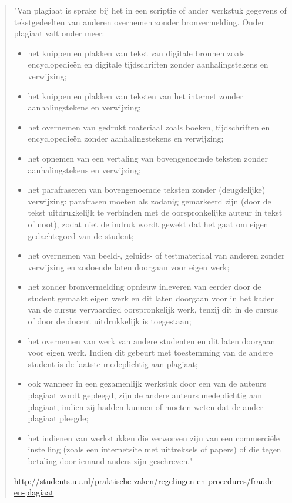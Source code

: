 \documentclass[
]{book}
\begin{document}
\begin{quote}
"Van plagiaat is sprake bij het in een scriptie of ander werkstuk
gegevens of tekstgedeelten van anderen overnemen zonder
bronvermelding. Onder plagiaat valt onder meer:

\begin{itemize}
\item
  het knippen en plakken van tekst van digitale bronnen zoals
  encyclopedieën en digitale tijdschriften zonder aanhalingstekens
  en verwijzing;
\item
  het knippen en plakken van teksten van het internet zonder
  aanhalingstekens en verwijzing;
\item
  het overnemen van gedrukt materiaal zoals boeken, tijdschriften en
  encyclopedieën zonder aanhalingstekens en verwijzing;
\item
  het opnemen van een vertaling van bovengenoemde teksten zonder
  aanhalingstekens en verwijzing;
\item
  het parafraseren van bovengenoemde teksten zonder (deugdelijke)
  verwijzing: parafrasen moeten als zodanig gemarkeerd zijn (door de
  tekst uitdrukkelijk te verbinden met de oorspronkelijke auteur in
  tekst of noot), zodat niet de indruk wordt gewekt dat het gaat om
  eigen gedachtegoed van de student;
\item
  het overnemen van beeld-, geluids- of testmateriaal van anderen
  zonder verwijzing en zodoende laten doorgaan voor eigen werk;
\item
  het zonder bronvermelding opnieuw inleveren van eerder door de
  student gemaakt eigen werk en dit laten doorgaan voor in het kader
  van de cursus vervaardigd oorspronkelijk werk, tenzij dit in de
  cursus of door de docent uitdrukkelijk is toegestaan;
\item
  het overnemen van werk van andere studenten en dit laten doorgaan
  voor eigen werk. Indien dit gebeurt met toestemming van de andere
  student is de laatste medeplichtig aan plagiaat;
\item
  ook wanneer in een gezamenlijk werkstuk door een van de auteurs
  plagiaat wordt gepleegd, zijn de andere auteurs medeplichtig aan
  plagiaat, indien zij hadden kunnen of moeten weten dat de ander
  plagiaat pleegde;
\item
  het indienen van werkstukken die verworven zijn van een
  commerciële instelling (zoals een internetsite met uittreksels of
  papers) of die tegen betaling door iemand anders zijn geschreven."
\end{itemize}

\url{http://students.uu.nl/praktische-zaken/regelingen-en-procedures/fraude-en-plagiaat}
\end{quote}
\end{document}
